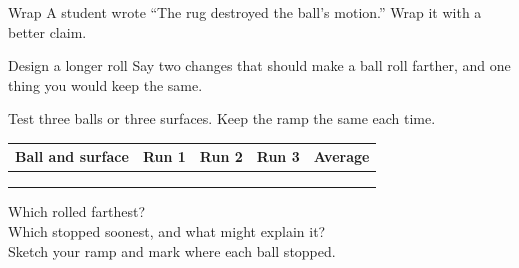 \begin{puzzle}{Wrap}
A student wrote ``The rug destroyed the ball's motion.'' Wrap it with a better claim. \wline[6cm]
\end{puzzle}

\begin{puzzle}{Design a longer roll}
Say two changes that should make a ball roll farther, and one thing you would keep the same. \wline[6cm]
\end{puzzle}
\clearpage

\thispagestyle{fancy}
Test three balls or three surfaces. Keep the ramp the same each time.\par\medskip
\renewcommand{\arraystretch}{3.0}
\begin{tabularx}{\linewidth}{|>{\sffamily\small\bfseries}p{2.6cm}|X|X|X|X|}
\hline
Ball and surface & Run 1 & Run 2 & Run 3 & Average \\ \hline
 & & & & \\ \hline
 & & & & \\ \hline
 & & & & \\ \hline
\end{tabularx}

\vspace{8pt}
Which rolled farthest? \wline[7cm]\\[10pt]
Which stopped soonest, and what might explain it? \wline[5cm]\\[10pt]
Sketch your ramp and mark where each ball stopped.\par\medskip
{}
\clearpage
